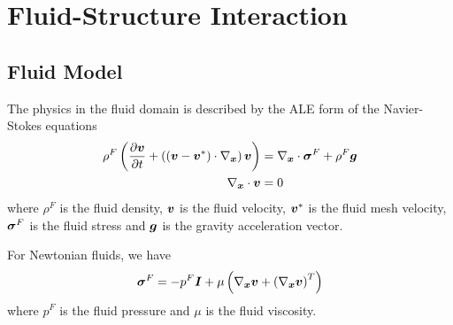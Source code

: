 \section{Fluid-Structure Interaction}
\label{sec:FSI}

\subsection{Fluid Model}

The physics in the fluid domain is described by the ALE form of the Navier-Stokes equations
\ie
\begin{align}
  \rho^{F}\pbrac{\delby{\vectr{v}}{t}+\pbrac{\dotprod{\pbrac{\vectr{v}-\vectr{v}^{*}}}{\grad_{\vectr{x}}}}\vectr{v}}&=\divergence{\vectr{x}}{\tensor{\sigma}^{F}}+\rho^{F}\vectr{g}\label{eqn:FSINavStokesMomentum}
  \\
    \divergence{\vectr{x}}{\vectr{v}}&=0 \label{eqn:FSINavStokesContinuity}
\end{align}
where $\rho^{F}$ is the fluid density, $\boldsymbol{v}$ is the fluid velocity,
$\boldsymbol{v}^{*}$ is the fluid mesh velocity, $\boldsymbol{\mathit{\sigma}}^{F}$ is the fluid
stress and $\boldsymbol{g}$ is the gravity acceleration vector.

For Newtonian fluids, we have
\begin{equation}
  \tensor{\sigma}^{F}=-p^{F}\tensor{I}+\mu\pbrac{\gradient{\vectr{x}}{\vectr{v}}+\transpose{\pbrac{\gradient{\vectr{x}}{\vectr{v}}}}}
\end{equation}
where $p^{F}$ is the fluid pressure and $\mu$ is the fluid viscosity.

